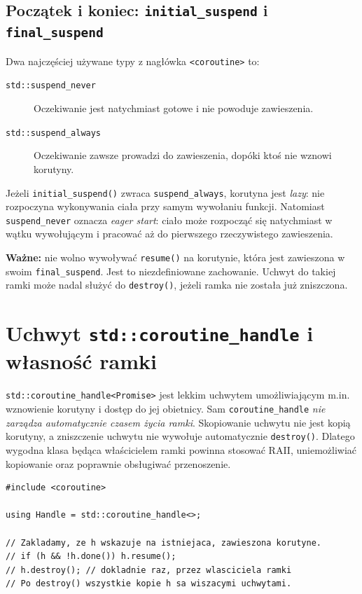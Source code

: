 \subsection{Początek i koniec: \texttt{initial\_suspend} i \texttt{final\_suspend}}

Dwa najczęściej używane typy z nagłówka \texttt{<coroutine>} to:
\begin{description}
\item[\texttt{std::suspend\_never}] Oczekiwanie jest natychmiast
      gotowe i nie powoduje zawieszenia.
\item[\texttt{std::suspend\_always}] Oczekiwanie zawsze prowadzi
      do zawieszenia, dopóki ktoś nie wznowi korutyny.
\end{description}

Jeżeli \texttt{initial\_suspend()} zwraca \texttt{suspend\_always},
korutyna jest \emph{lazy}: nie rozpoczyna wykonywania ciała przy samym
wywołaniu funkcji. Natomiast \texttt{suspend\_never} oznacza
\emph{eager start}: ciało może rozpocząć się natychmiast w wątku
wywołującym i pracować aż do pierwszego rzeczywistego zawieszenia.

\textbf{Ważne:} nie wolno wywoływać \texttt{resume()} na korutynie,
która jest zawieszona w swoim \texttt{final\_suspend}. Jest to
niezdefiniowane zachowanie. Uchwyt do takiej ramki może nadal służyć
do \texttt{destroy()}, jeżeli ramka nie została już zniszczona.

\section{Uchwyt \texttt{std::coroutine\_handle} i własność ramki}

\texttt{std::coroutine\_handle<Promise>} jest lekkim uchwytem
umożliwiającym m.in. wznowienie korutyny i dostęp do jej obietnicy.
Sam \texttt{coroutine\_handle} \emph{nie zarządza automatycznie
czasem życia ramki}. Skopiowanie uchwytu nie jest kopią korutyny,
a zniszczenie uchwytu nie wywołuje automatycznie \texttt{destroy()}.
Dlatego wygodna klasa będąca właścicielem ramki powinna stosować RAII,
uniemożliwiać kopiowanie oraz poprawnie obsługiwać przenoszenie.

\begin{lstlisting}[caption={Operacje na uchwycie; fragment ilustracyjny.}]
#include <coroutine>

using Handle = std::coroutine_handle<>;

// Zakladamy, ze h wskazuje na istniejaca, zawieszona korutyne.
// if (h && !h.done()) h.resume();
// h.destroy(); // dokladnie raz, przez wlasciciela ramki
// Po destroy() wszystkie kopie h sa wiszacymi uchwytami.
\end{lstlisting}

